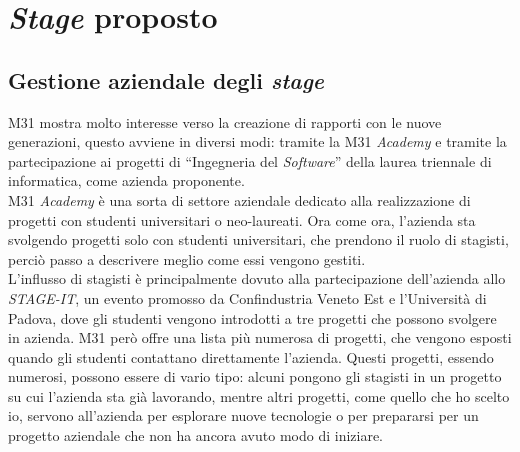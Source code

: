\chapter{\textit{Stage} proposto}
\label{chap:stage-proposto}

\section{Gestione aziendale degli \textit{stage}}\label{sec:stage-management}\noindent
M31 mostra molto interesse verso la creazione di rapporti con le nuove generazioni, questo avviene in diversi modi: tramite la M31 \textit{Academy} e tramite la partecipazione ai progetti di ``Ingegneria del \textit{Software}'' della laurea triennale di informatica, come azienda proponente.\\
M31 \textit{Academy} è una sorta di settore aziendale dedicato alla realizzazione di progetti con studenti universitari o neo-laureati. Ora come ora, l'azienda sta svolgendo progetti solo con studenti universitari, che prendono il ruolo di stagisti, perciò passo a descrivere meglio come essi vengono gestiti.\\
L'influsso di stagisti è principalmente dovuto alla partecipazione dell'azienda allo \textit{STAGE-IT}, un evento promosso da Confindustria Veneto Est e l'Università di Padova, dove gli studenti vengono introdotti a tre progetti che possono svolgere in azienda. M31 però offre una lista più numerosa di progetti, che vengono esposti quando gli studenti contattano direttamente l'azienda.
Questi progetti, essendo numerosi, possono essere di vario tipo: alcuni pongono gli stagisti in un progetto su cui l'azienda sta già lavorando, mentre altri progetti, come quello che ho scelto io, servono all'azienda per esplorare nuove tecnologie o per prepararsi per un progetto aziendale che non ha ancora avuto modo di iniziare.

